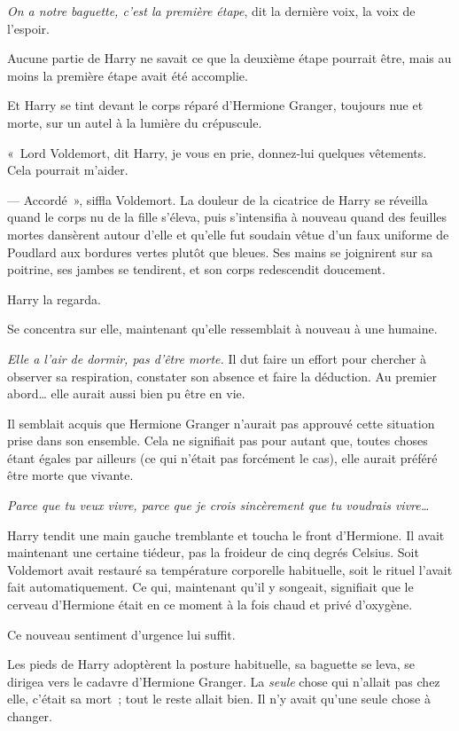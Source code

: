 \emph{On a notre baguette, c'est la première étape}, dit la dernière voix, la voix de l'espoir.

Aucune partie de Harry ne savait ce que la deuxième étape pourrait être, mais au moins la première étape avait été accomplie.

Et Harry se tint devant le corps réparé d'Hermione Granger, toujours nue et morte, sur un autel à la lumière du crépuscule.

«~Lord Voldemort, dit Harry, je vous en prie, donnez-lui quelques vêtements. Cela pourrait m'aider.

--- Accordé~», siffla Voldemort. La douleur de la cicatrice de Harry se réveilla quand le corps nu de la fille s'éleva, puis s'intensifia à nouveau quand des feuilles mortes dansèrent autour d'elle et qu'elle fut soudain vêtue d'un faux uniforme de Poudlard aux bordures vertes plutôt que bleues. Ses mains se joignirent sur sa poitrine, ses jambes se tendirent, et son corps redescendit doucement.

Harry la regarda.

Se concentra sur elle, maintenant qu'elle ressemblait à nouveau à une humaine.

\emph{Elle a l'air de dormir, pas d'être morte.} Il dut faire un effort pour chercher à observer sa respiration, constater son absence et faire la déduction. Au premier abord… elle aurait aussi bien pu être en vie.

Il semblait acquis que Hermione Granger n'aurait pas approuvé cette situation prise dans son ensemble. Cela ne signifiait pas pour autant que, toutes choses étant égales par ailleurs (ce qui n'était pas forcément le cas), elle aurait préféré être morte que vivante.

\emph{Parce que tu veux vivre, parce que je crois sincèrement que tu voudrais vivre…}

Harry tendit une main gauche tremblante et toucha le front d'Hermione. Il avait maintenant une certaine tiédeur, pas la froideur de cinq degrés Celsius. Soit Voldemort avait restauré sa température corporelle habituelle, soit le rituel l'avait fait automatiquement. Ce qui, maintenant qu'il y songeait, signifiait que le cerveau d'Hermione était en ce moment à la fois chaud et privé d'oxygène.

Ce nouveau sentiment d'urgence lui suffit.

Les pieds de Harry adoptèrent la posture habituelle, sa baguette se leva, se dirigea vers le cadavre d'Hermione Granger. La \emph{seule} chose qui n'allait pas chez elle, c'était sa mort~; tout le reste allait bien. Il n'y avait qu'une seule chose à changer.

